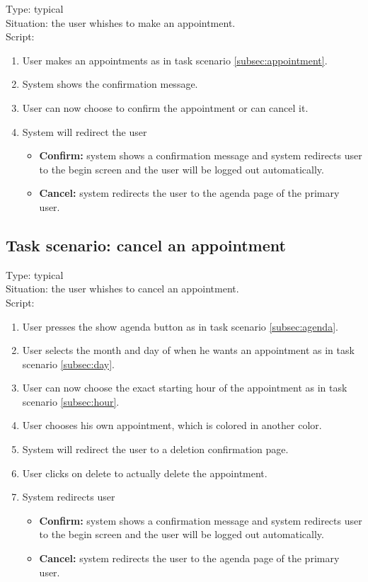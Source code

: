 \documentclass[11pt, a4paper,svglistings]{report}
\begin{document}
Type: typical \\
Situation: the user whishes to make an appointment. \\
Script:
\begin{enumerate}
\item User makes an appointments as in task scenario \ref{subsec:appointment}.
\item System shows the confirmation message.
\item User can now choose to confirm the appointment or can cancel it.
\item System will redirect the user
\begin{itemize}
\item \textbf{Confirm:} system shows a confirmation message and system redirects user to the begin screen and the user will be logged out automatically.
\item \textbf{Cancel:} system redirects the user to the agenda page of the primary user.
\end{itemize}
\end{enumerate}


\subsection{Task scenario: cancel an appointment}

Type: typical \\
Situation: the user whishes to cancel an appointment. \\
Script:
\begin{enumerate}
\item User presses the show agenda button as in task scenario \ref{subsec:agenda}.
\item User selects the month and day of when he wants an appointment as in task scenario \ref{subsec:day}.
\item User can now choose the exact starting hour of the appointment as in task scenario \ref{subsec:hour}.
\item User chooses his own appointment, which is colored in another color.
\item System will redirect the user to a deletion confirmation page.
\item User clicks on delete to actually delete the appointment.
\item System redirects user
\begin{itemize}
\item \textbf{Confirm:} system shows a confirmation message and system redirects user to the begin screen and the user will be logged out automatically.
\item \textbf{Cancel:} system redirects the user to the agenda page of the primary user.
\end{itemize}
\end{enumerate}
\end{document}
